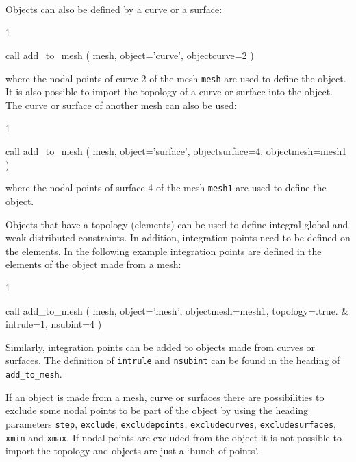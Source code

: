 Objects can also be defined by a curve or a surface:
\begin{listing}{1}

  call add_to_mesh ( mesh, object='curve', objectcurve=2 )

\end{listing}
where the nodal points of curve 2 of the mesh \texttt{mesh}
are used to define the object. It is
also possible to import the topology of a curve or surface into the object.
The curve or surface of another mesh can also be used:
\begin{listing}{1}

  call add_to_mesh ( mesh, object='surface', objectsurface=4, objectmesh=mesh1 )

\end{listing}
where the nodal points of surface 4 of the mesh \texttt{mesh1} are used to
define the object.

Objects that have a topology (elements) can be used to define integral global
and weak distributed constraints. In addition, integration points need to be
defined on the elements. In the following example integration points are
defined in the elements of the object made from a mesh:
\begin{listing}{1}

  call add_to_mesh ( mesh, object='mesh', objectmesh=mesh1, topology=.true. &
    intrule=1, nsubint=4 )

\end{listing}
Similarly, integration points can be added to objects made from curves or
surfaces.
The definition of \texttt{intrule} and \texttt{nsubint} can be found in the
heading of \texttt{add\_to\_mesh}.

If an object is made from a mesh, curve or surfaces there are possibilities to
exclude some nodal points to be part of the object by using the heading
parameters
\texttt{step}, \texttt{exclude}, \texttt{excludepoints},
\texttt{excludecurves}, \texttt{excludesurfaces},
\texttt{xmin} and \texttt{xmax}.
If nodal points are excluded from the object it
is not possible to import the topology and objects are just a `bunch of
points'.

